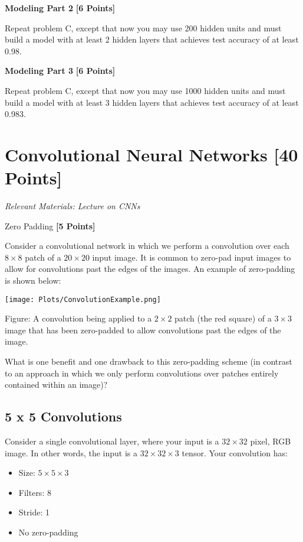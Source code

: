  \problem \textbf{Modeling Part 2} \textbf{[6 Points]}

 Repeat problem C, except that now you may use 200 hidden units and must build a model with at least 2 hidden layers that achieves test accuracy of at least 0.98.


  \problem \textbf{Modeling Part 3} \textbf{[6 Points]}

 Repeat problem C, except that now you may use 1000 hidden units and must build a model with at least 3 hidden layers that achieves test accuracy of at least 0.983.


 \newpage
 \section{Convolutional Neural Networks  [40 Points]}
 \textit{Relevant Materials: Lecture on CNNs}

 \problem Zero Padding \textbf{[5 Points]}

 Consider a convolutional network in which we perform a convolution over each $8 \times 8$ patch of a $20 \times 20$ input image. It is common to zero-pad input images to allow for convolutions past the edges of the images. An example of zero-padding is shown below:

\begin{center}
  \texttt{[image: Plots/ConvolutionExample.png]}
\end{center}
\begin{small}
Figure: A convolution being applied to a $2 \times 2$ patch (the red square) of a $3 \times 3$ image that has been zero-padded to allow convolutions past the edges of the image.
\end{small}

What is one benefit and one drawback to this zero-padding scheme (in contrast to an approach in which we only perform convolutions over patches entirely contained within an image)?

\subsection{5 x 5 Convolutions}

Consider a single convolutional layer, where your input is a $32 \times 32$ pixel, RGB image. In other words, the input is a $32 \times 32 \times 3$ tensor. Your convolution has:

\begin{itemize}
\item Size: $5 \times 5 \times 3$
\item Filters: 8
\item Stride: 1
\item No zero-padding
\end{itemize}

